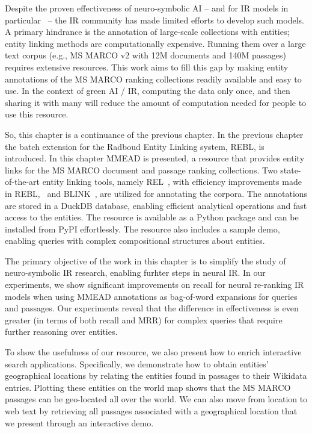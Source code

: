Despite the proven effectiveness of neuro-symbolic AI -- and for IR models in particular~\citep{Tran:2022:DRE, Gerritse:2022:EMBERT, chatterjee2022bert} -- the IR community has made limited efforts to develop such models. A primary hindrance is the annotation of large-scale collections with entities; entity linking methods are computationally expensive. Running them over a large text corpus (e.g., MS MARCO v2 with 12M documents and 140M passages) requires extensive resources. This work aims to fill this gap by making entity annotations of the MS MARCO ranking collections readily available and easy to use. In the context of green AI / IR, computing the data only once, and then sharing it with many will reduce the amount of computation needed for people to use this resource. %

So, this chapter is a continuance of the previous chapter. In the previous chapter the batch extension for the Radboud Entity Linking system, REBL, is introduced. In this chapter MMEAD is presented, a resource that provides entity links for the MS MARCO document and passage ranking collections. Two state-of-the-art entity linking tools, namely REL~\citep{rel}, with efficiency improvements made in REBL,~\citep{rebl} and BLINK~\citep{blink}, are utilized for annotating the corpora. The annotations are stored in a DuckDB database, enabling efficient analytical operations and fast access to the entities. The resource is available as a Python package and can be installed from PyPI effortlessly. The resource also includes a sample demo, enabling queries with complex compositional structures about entities. 

The primary objective of the work in this chapter is to simplify the study of neuro-symbolic IR research, enabling furhter steps in neural IR. In our experiments, we show significant improvements on recall for neural re-ranking IR models when using MMEAD annotations as bag-of-word expansions for queries and passages. Our experiments reveal that the difference in effectiveness is even greater (in terms of both recall and MRR) for complex queries that require further reasoning over entities.

To show the usefulness of our resource, we also present how to enrich interactive search applications. Specifically, we demonstrate how to obtain entities' geographical locations by relating the entities found in passages to their Wikidata entries. Plotting these entities on the world map shows that the MS MARCO passages can be geo-located all over the world.
We can also move from location to web text by retrieving all passages associated with a geographical location that we present through an interactive demo. 

